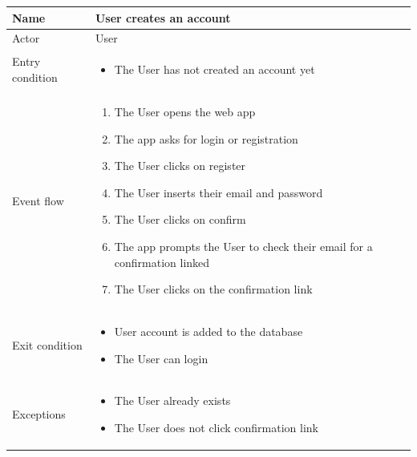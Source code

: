 \begin{table}[H]
    \begin{tabularx}{\textwidth}{|X|p{}|}
    \hline
    Name           & User creates an account   \\ \hline
    Actor          & User \\ \hline
    Entry condition & \begin{itemize}
        \item The User has not created an account yet
    \end{itemize}\\ \hline
    Event flow     & \begin{enumerate}
        \item The User opens the web app
        \item The app asks for login or registration
        \item The User clicks on register
        \item The User inserts their email and password
        \item The User clicks on confirm
        \item The app prompts the User to check their email for a confirmation linked
        \item The User clicks on the confirmation link
    \end{enumerate} \\ \hline
    Exit condition & \begin{itemize}
        \item User account is added to the database
        \item The User can login
    \end{itemize}\\ \hline
    Exceptions & \begin{itemize}
        \item The User already exists
        \item The User does not click confirmation link
    \end{itemize} \\ \hline
    \end{tabularx}
\end{table}

